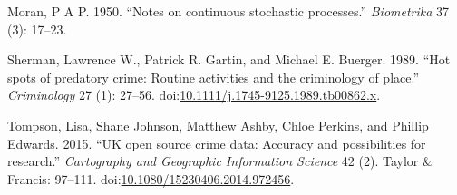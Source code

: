 \documentclass[]{article}
\theoremstyle{definition}
\theoremstyle{definition}
\theoremstyle{definition}
\theoremstyle{remark}
\begin{document}
\hypertarget{ref-Moran1950}{}
Moran, P A P. 1950. ``Notes on continuous stochastic processes.''
\emph{Biometrika} 37 (3): 17--23.

\hypertarget{ref-Sherman1989}{}
Sherman, Lawrence W., Patrick R. Gartin, and Michael E. Buerger. 1989.
``Hot spots of predatory crime: Routine activities and the criminology
of place.'' \emph{Criminology} 27 (1): 27--56.
doi:\href{https://doi.org/10.1111/j.1745-9125.1989.tb00862.x}{10.1111/j.1745-9125.1989.tb00862.x}.

\hypertarget{ref-Tompson2015}{}
Tompson, Lisa, Shane Johnson, Matthew Ashby, Chloe Perkins, and Phillip
Edwards. 2015. ``UK open source crime data: Accuracy and possibilities
for research.'' \emph{Cartography and Geographic Information Science} 42
(2). Taylor \& Francis: 97--111.
doi:\href{https://doi.org/10.1080/15230406.2014.972456}{10.1080/15230406.2014.972456}.
\end{document}

